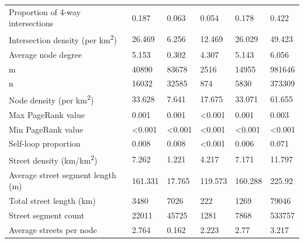 \documentclass[Afour,sageh,times]{sagej}
\begin{document}
\begin{table}
\begin{tabular}{llllll}
	Proportion of 4-way intersections           & 0.187          & 0.063          & 0.054          & 0.178          & 0.422          \\
	Intersection density (per km\textsuperscript{2})              & 26.469         & 6.256          & 12.469         & 26.029         & 49.423         \\
	Average node degree                         & 5.153          & 0.302          & 4.307          & 5.143          & 6.056          \\
	m                                           & 40890          & 83678          & 2516           & 14955          & 981646         \\
	n                                           & 16032          & 32585          & 874            & 5830           & 373309         \\
	Node density (per km\textsuperscript{2})                      & 33.628         & 7.641          & 17.675         & 33.071         & 61.655         \\
	Max PageRank value                          & 0.001          & 0.001          & \textless0.001 & 0.001          & 0.003          \\
	Min PageRank value                          & \textless0.001 & \textless0.001 & \textless0.001 & \textless0.001 & \textless0.001 \\
	Self-loop proportion                        & 0.008          & 0.008          & \textless0.001 & 0.006          & 0.071          \\
	Street density (km/km\textsuperscript{2})                     & 7.262          & 1.221          & 4.217          & 7.171          & 11.797         \\
	Average street segment length (m)           & 161.331        & 17.765         & 119.573        & 160.288        & 225.92         \\
	Total street length (km)                    & 3480           & 7026           & 222            & 1269           & 79046          \\
	Street segment count                        & 22011          & 45725          & 1281           & 7868           & 533757         \\
	Average streets per node                    & 2.764          & 0.162          & 2.223          & 2.77           & 3.217          \\
	\bottomrule
\end{tabular}
\end{table}
\end{document}
